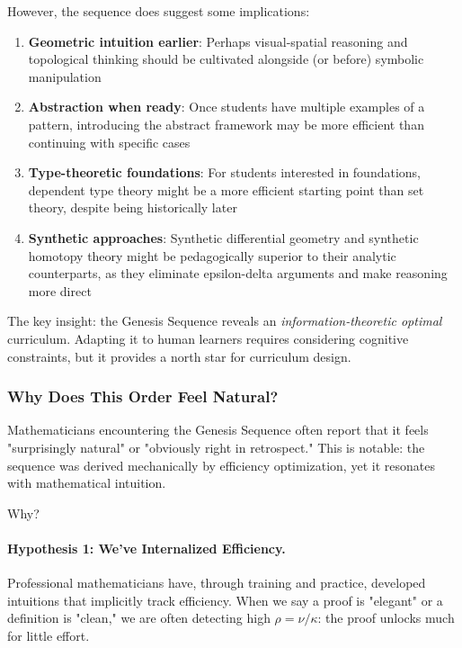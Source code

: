 \documentclass[11pt]{article}
\theoremstyle{definition}
\begin{document}
However, the sequence does suggest some implications:
\begin{enumerate}
\item \textbf{Geometric intuition earlier}: Perhaps visual-spatial reasoning and topological thinking should be cultivated alongside (or before) symbolic manipulation

\item \textbf{Abstraction when ready}: Once students have multiple examples of a pattern, introducing the abstract framework may be more efficient than continuing with specific cases

\item \textbf{Type-theoretic foundations}: For students interested in foundations, dependent type theory might be a more efficient starting point than set theory, despite being historically later

\item \textbf{Synthetic approaches}: Synthetic differential geometry and synthetic homotopy theory might be pedagogically superior to their analytic counterparts, as they eliminate epsilon-delta arguments and make reasoning more direct
\end{enumerate}

The key insight: the Genesis Sequence reveals an \emph{information-theoretic optimal} curriculum. Adapting it to human learners requires considering cognitive constraints, but it provides a north star for curriculum design.

\subsubsection{Why Does This Order Feel Natural?}

Mathematicians encountering the Genesis Sequence often report that it feels "surprisingly natural" or "obviously right in retrospect." This is notable: the sequence was derived mechanically by efficiency optimization, yet it resonates with mathematical intuition.

Why?

\paragraph{Hypothesis 1: We've Internalized Efficiency.}
Professional mathematicians have, through training and practice, developed intuitions that implicitly track efficiency. When we say a proof is "elegant" or a definition is "clean," we are often detecting high $\rho = \nu/\kappa$: the proof unlocks much for little effort.
\end{document}
